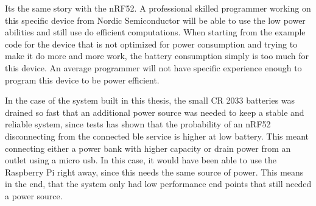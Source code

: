Its the same story with the nRF52. A professional skilled programmer working on this specific device from Nordic Semiconductor will be able to use the low power abilities and still use do efficient computations. When starting from the example code for the device that is not optimized for power consumption and trying to make it do more and more work, the battery consumption simply is too much for this device. An average programmer will not have specific experience enough to program this device to be power efficient. 

In the case of the system built in this thesis, the small CR 2033 batteries was drained so fast that an additional power source was needed to keep a stable and reliable system, since tests has shown that the probability of an nRF52 disconnecting from the connected \gls{ble} service is higher at low battery. This meant connecting either a power bank with higher capacity or drain power from an outlet using a micro \gls{usb}. In this case, it would have been able to use the Raspberry Pi right away, since this needs the same source of power. This means in the end, that the system only had low performance end points that still needed a power source. 


  
